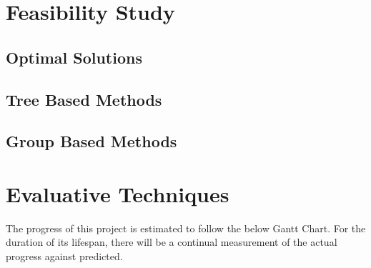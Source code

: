 \documentclass{report}
\begin{document}
    \section{Feasibility Study}
    \subsection{Optimal Solutions}
	\subsection{Tree Based Methods}
    \subsection{Group Based Methods}
    
    \section{Evaluative Techniques}
    The progress of this project is estimated to follow the below Gantt Chart. For the duration of its lifespan, there will be a continual measurement of the actual progress against predicted.
    
\end{document}
